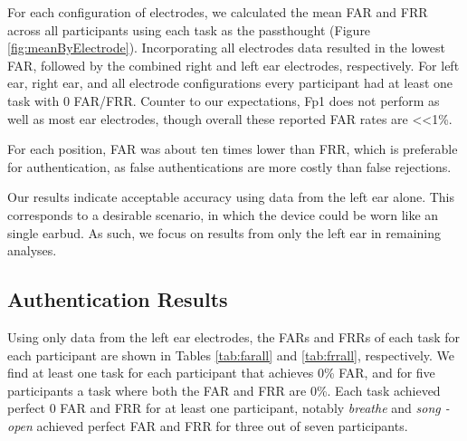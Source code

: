 \documentclass{sigchi}
\begin{document}
For each configuration of electrodes, we calculated the mean FAR and FRR across all participants using each task as the passthought (Figure \ref{fig:meanByElectrode}). Incorporating all electrodes data resulted in the lowest FAR, followed by the combined right and left ear electrodes, respectively. For left ear, right ear, and all electrode configurations every participant had at least one task with 0 FAR/FRR. Counter to our expectations, Fp1 does not perform as well as most ear electrodes, though overall these reported FAR rates are \textless\textless 1\%. 

For each position, FAR was about ten times lower than FRR, which is preferable for authentication, as false authentications are more costly than false rejections.

Our results indicate acceptable accuracy using data from the left ear alone. This corresponds to a desirable scenario, in which the device could be worn like an single earbud. As such, we focus on results from only the left ear in remaining analyses.

\subsection{Authentication Results}

Using only data from the left ear electrodes, the FARs and FRRs of each task for each participant are shown in Tables \ref{tab:farall} and \ref{tab:frrall}, respectively. We find at least one task for each participant that achieves 0\% FAR, and for five participants a task where both the FAR and FRR are 0\%. Each task achieved perfect 0 FAR and FRR for at least one participant, notably \textit{breathe} and \textit{song - open} achieved perfect FAR and FRR for three out of seven participants.
\end{document}
